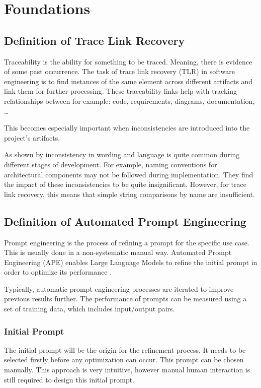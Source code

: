 \chapter{Foundations}

\section{Definition of Trace Link Recovery}
Traceability is the ability for something to be traced. Meaning, there is evidence of some past occurrence. %
The task of trace link recovery (TLR) in software engineering is to find instances of the same element across different artifacts and link them for further processing. These traceability links help with tracking relationships between for example: code, requirements, diagrams, documentation, \dots

This becomes especially important when inconsistencies are introduced into the project's artifacts. 

As shown by  inconsistency in wording and language is quite common during different stages of development. For example, naming conventions for architectural components may not be followed during implementation. They find the impact of these inconsistencies to be quite insignificant. However, for trace link recovery, this means that simple string comparisons by name are insufficient.



\section{Definition of Automated Prompt Engineering}
Prompt engineering is the process of refining a prompt for the specific use case. This is usually done in a non-systematic manual way. Automated Prompt Engineering (APE) enables Large Language Models to refine the initial prompt in order to optimize its performance \cite{zadenoori2025AutomaticPrompt}. 

Typically, automatic prompt engineering processes are iterated to improve previous results further\citeiterative . The performance of prompts can be measured using a set of training data, which includes input/output pairs. 

\subsection{Initial Prompt}
The initial prompt will be the origin for the refinement process. It needs to be selected firstly before any optimization can occur. This prompt can be chosen manually. This approach is very intuitive, however manual human interaction is still required to design this initial prompt. 

